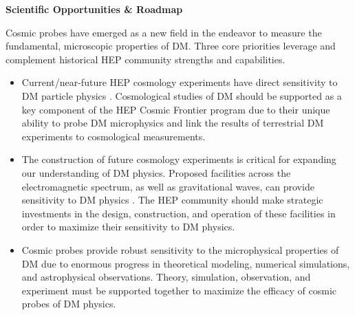\documentclass[nofootinbib]{article}
\begin{document}

\vspace{1em}
\noindent \textbf{Scientific Opportunities \& Roadmap}

\noindent Cosmic probes have emerged as a new field in the endeavor to measure the fundamental, microscopic properties of DM. Three core priorities leverage and complement historical HEP community strengths and capabilities.

\begin{itemize}[nosep]
    \item Current/near-future HEP cosmology experiments have direct sensitivity to DM particle physics \cite{Valluri:2022nrh,Mao:2022fyx,Dvorkin:2022bsc}. {Cosmological studies of DM should be supported as a key component of the HEP Cosmic Frontier program due to their unique ability to probe DM microphysics and link the results of terrestrial DM experiments to cosmological measurements.}

    \item {{The construction of future cosmology experiments is critical for expanding our understanding of DM physics.} Proposed facilities across the electromagnetic spectrum, as well as gravitational waves, can provide sensitivity to DM physics \cite{Chakrabarti:2022cbu}. The HEP community should make strategic investments in the design, construction, and operation of these facilities in order to maximize their sensitivity to DM physics.}

    \item Cosmic probes provide robust sensitivity to the microphysical properties of DM due to enormous progress in theoretical modeling, numerical simulations, and astrophysical observations. {Theory, simulation, observation, and experiment must be supported together to maximize the efficacy of cosmic probes of DM physics.}
\end{itemize}

\vspace{1em}
\end{document}
